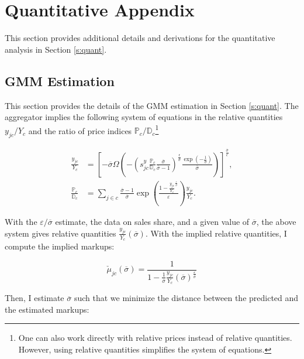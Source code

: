 \newpage
\section{Quantitative Appendix}
This section provides additional details and derivations for the quantitative analysis in Section \ref{s:quant}.

\subsection{GMM Estimation}\label{a:gmmest}
This section provides the details of the GMM estimation in Section \ref{s:quant}. The \textcite{Klenow&Willis16} aggregator implies the following system of equations in the relative quantities $y_{jc}/Y_c$ and the ratio of price indices $\mathbb{P}_c/\mathbb{D}_c$\footnote{One can also work directly with relative prices instead of relative quantities. However, using relative quantities simplifies the system of equations.}

\begin{align*}
	\frac{y_{jc}}{Y_c} & = \left[ - \overline{\sigma} \Omega\left(- \left(s^y_{jc}\frac{\mathbb{P}_c}{\mathbb{D}_c} \frac{\overline{\sigma}}{\overline{\sigma} - 1} \right)^{\frac{\epsilon}{\overline{\sigma}}} \frac{ \exp\left(-\frac{1}{\overline{\sigma}}\right)}{\overline{\sigma}}  \right) \right]^{\frac{\overline{\sigma}}{\epsilon}},\\
	\frac{\mathbb{P}_c}{\mathbb{D}_c} & =  \sum_{j \in c} \frac{\overline{\sigma} -1}{\overline{\sigma}} \exp\left(\frac{1 - \frac{y_{jc}}{Y_c}^\frac{\varepsilon}{\overline{\sigma}}}{\varepsilon}\right) \frac{y_{jc}}{Y_c}.
\end{align*}

With the $\varepsilon/\overline{\sigma}$ estimate, the data on sales share, and a given value of $\overline{\sigma}$, the above system gives relative quantities $\frac{y_{jc}}{Y_c}\left(\overline{\sigma}\right)$. With the implied relative quantities, I compute the implied markups:

\begin{equation*}
	\check{\mu}_{jc}(\overline{\sigma}) = \frac{1}{1 - \frac{1}{\overline{\sigma}}  \frac{y_{jc}}{Y_c}\left(\overline{\sigma}\right)^\frac{\varepsilon}{\overline{\sigma}}}
\end{equation*}

Then, I estimate $\overline{\sigma}$ such that we minimize the distance between the predicted and the estimated markups:

